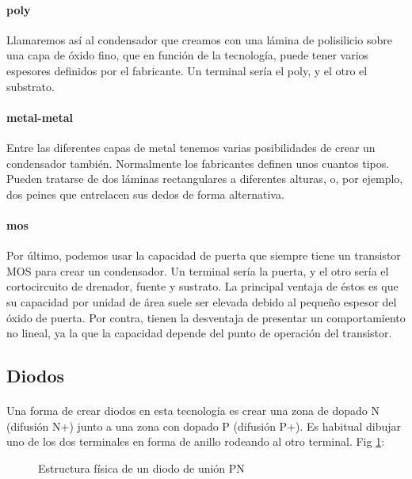 \paragraph{poly}
Llamaremos así al condensador que creamos con una lámina de polisilicio sobre una
capa de óxido fino, que en función de la tecnología, puede tener varios espesores
definidos por el fabricante. Un terminal sería el poly, y el otro el substrato.

\paragraph{metal-metal}
Entre las diferentes capas de metal tenemos varias posibilidades de crear un condensador
también. Normalmente los fabricantes definen unos cuantos tipos. Pueden tratarse de
dos láminas rectangulares a diferentes alturas, o, por ejemplo, dos peines que
entrelacen sus dedos de forma alternativa.

\paragraph{mos}
Por último, podemos usar la capacidad de puerta que siempre tiene un transistor MOS
para crear un condensador. Un terminal sería la puerta, y el otro sería el cortocircuito
de drenador, fuente y sustrato. La principal ventaja de éstos es que su capacidad por
unidad de área suele ser elevada debido al pequeño espesor del óxido de puerta. Por contra,
tienen la desventaja de presentar un comportamiento no lineal, ya la que la capacidad
depende del punto de operación del transistor.

\subsection{Diodos}\label{cap:diodos}
\paragraph{}
Una forma de crear diodos en esta tecnología es crear una zona de dopado N (difusión N+)
junto a una zona con dopado P (difusión P+). Es habitual dibujar uno de los dos terminales
en forma de anillo rodeando al otro terminal. Fig \ref{fig:diodo}:

\begin{figure}[h]
	\centering
	
	\caption{Estructura física de un diodo de unión PN}
	\label{fig:diodo}
\end{figure}

